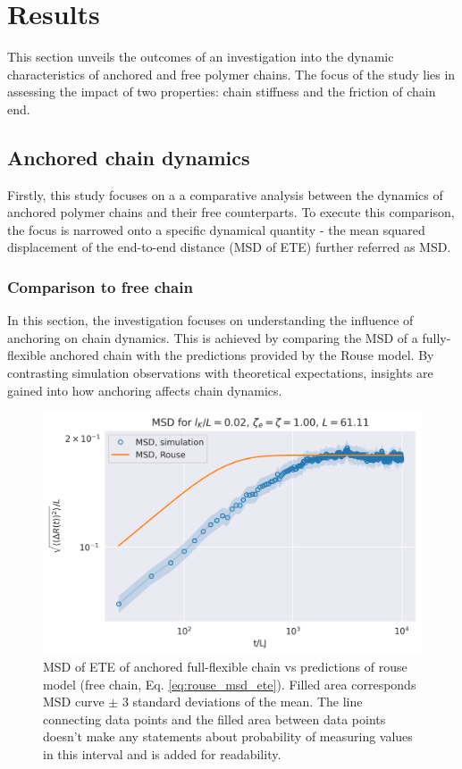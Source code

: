 \documentclass[
    paper=A4,pagesize=automedia,fontsize=12pt,
    BCOR=15mm,DIV=22,
    twoside,headinclude,footinclude=false,
    fleqn,             %
    bibliography=totocnumbered,          %
    listof=totoc,                %
    listof=flat,                 %
    cleardoublepage=empty      %
    numbers=endperiod
]{scrartcl}
\begin{document}
\section{Results}
This section unveils the outcomes of an investigation into the dynamic
characteristics of anchored and free polymer chains. 
The focus of the study lies in assessing the impact 
of two properties: chain stiffness and the friction of chain end.

\subsection{Anchored chain dynamics}
Firstly, this study focuses on a a comparative analysis between the 
dynamics of anchored polymer chains and their free counterparts.
To execute this comparison, the focus is narrowed onto a specific dynamical
quantity - the mean squared displacement of the end-to-end distance (MSD of ETE)
further referred as MSD.

\subsubsection{Comparison to free chain}

In this section, the investigation focuses on understanding 
the influence of anchoring on chain dynamics. 
This is achieved by comparing the MSD of a fully-flexible anchored 
chain with the predictions provided by the Rouse model. 
By contrasting simulation observations with theoretical
expectations, insights are gained into how anchoring 
affects chain dynamics.

\begin{figure}
    \begin{center}
      \includegraphics[width=\columnwidth,trim={0cm 0cm 0cm 0.9cm},clip]{3-exp-fixed-param-log.png}
      \caption{\label{fig:anchored_flex_chain_vs_rouse}
      MSD of ETE of anchored full-flexible chain vs predictions of rouse model (free chain, Eq. \ref{eq:rouse_msd_ete}).
      Filled area corresponds MSD curve $\pm$ 3 standard deviations of the mean. The
      line connecting data points and the filled area between data points doesn't make
      any statements about probability of measuring values in this interval and is
      added for readability.
      }
    \end{center}
\end{figure}
\end{document}
